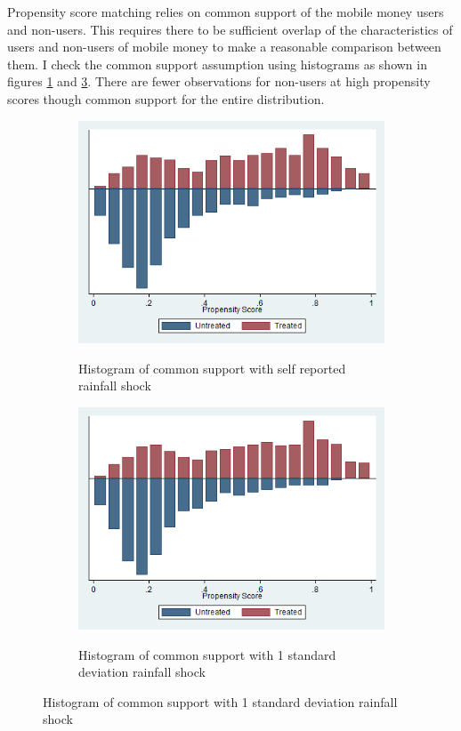  

Propensity score matching relies on common support of the mobile money users and non-users. This requires there to be sufficient overlap of the characteristics of users and non-users of mobile money to make a reasonable comparison between them. I check the common support assumption using histograms as shown in figures \ref{pscore1} and \ref{pscore2}. There are fewer observations for non-users at high propensity scores though common support for the entire distribution.  

\begin{figure}[h]
\centering
\caption{Histograms of common support}
\begin{subfigure}[h]{0.4\textwidth}
\caption{Histogram of common support with self reported rainfall shock }
\includegraphics[width=\textwidth,trim= 0.5cm 0cm 0.5cm 0.5cm, clip=true, keepaspectratio]{pscoreS1} \label{pscore1}
\end{subfigure}
\begin{subfigure}[h]{0.4\textwidth}
\caption{Histogram of common support with 1 standard deviation rainfall shock}
\includegraphics[width=\textwidth,trim= 0.5cm 0cm 0.5cm 0.5cm, clip=true, keepaspectratio]{pscoreRY} \label{pscore2}
\end{subfigure}
\end{figure}

